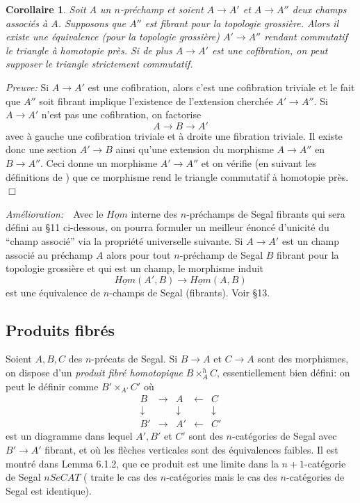 \documentclass[12pt]{article}
\newcommand{\subnumero}[1]{\subsection*{#1}\phantomsection\addcontentsline{toc}{subsection}{#1}}
\newcommand{\eop}{\hfill $\Box$\vspace{.1in}}
\newtheorem{corollaire}[lemma]{Corollaire}
\begin{document}
\begin{corollaire}
\label{unique}
Soit $A$ un $n$-pr\'echamp et soient $A\rightarrow A'$ et $A\rightarrow A''$
deux champs associ\'es \`a $A$. Supposons que $A''$ est fibrant pour la
topologie grossi\`ere. Alors il existe une \'equivalence (pour la topologie
grossi\`ere) $A'\rightarrow A''$ rendant commutatif le triangle \`a homotopie
pr\`es. Si de plus $A\rightarrow A'$ est une cofibration, on peut supposer
le triangle
strictement commutatif.
\end{corollaire}
{\em Preuve:}
Si $A\rightarrow A'$ est une cofibration, alors c'est une cofibration
triviale et
le fait que $A''$ soit fibrant implique l'existence de l'extension
cherch\'ee $A'\rightarrow
A''$.  Si $A\rightarrow A'$ n'est pas une cofibration, on factorise
$$
A\rightarrow B \rightarrow A'
$$
avec \`a gauche une cofibration triviale et \`a droite une fibration
triviale. Il existe donc une section $A'\rightarrow B$ ainsi qu'une extension
du morphisme $A\rightarrow A''$ en $B\rightarrow A''$. Ceci donne un morphisme
$A'\rightarrow A''$ et on v\'erifie (en suivant les d\'efinitions de
\cite{Quillen})
que ce morphisme rend le triangle commutatif \`a homotopie pr\`es.
\eop

{\em Am\'elioration:} \,\, Avec le $\underline{Hom}$ interne des
$n$-pr\'echamps de
Segal fibrants qui sera d\'efini au \S 11 ci-dessous, on pourra formuler un
meilleur \'enonc\'e d'unicit\'e du ``champ associ\'e'' via la propri\'et\'e
universelle suivante. Si $A\rightarrow A'$ est
un champ associ\'e au pr\'echamp $A$ alors pour tout $n$-pr\'echamp de Segal $B$
fibrant pour la topologie grossi\`ere et qui est un champ, le morphisme
induit
$$
\underline{Hom}(A',B)\rightarrow \underline{Hom}(A,B)
$$
est une \'equivalence de $n$-champs de Segal (fibrants).
Voir \S 13.



\subnumero{Produits fibr\'es}

Soient $A,B,C$ des $n$-pr\'ecats de Segal. Si $B\rightarrow A$
et $C\rightarrow A$ sont des morphismes, on dispose d'un {\em produit fibr\'e
homotopique} $B\times ^h_AC$, essentiellement bien d\'efini: on peut le
d\'efinir comme $B'\times _{A'}C'$ o\`u
$$
\begin{array}{ccccc}
B&\rightarrow & A & \leftarrow & C \\
\downarrow && \downarrow && \downarrow \\
B'&\rightarrow & A' & \leftarrow & C'
\end{array}
$$
est un diagramme dans lequel $A',B'$ et $C'$ sont des $n$-cat\'egories de
Segal avec
$B'\rightarrow A'$ fibrant, et  o\`u les fl\`eches verticales sont des
\'equivalences
faibles. Il est montr\'e dans \cite{limits} Lemma 6.1.2, que ce produit est une
limite dans la $n+1$-cat\'egorie de Segal $nSeCAT$ (\cite{limits} traite le cas
des $n$-cat\'egories mais le cas des $n$-cat\'egories de Segal est identique).
\end{document}
